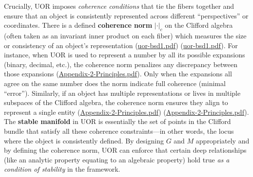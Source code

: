 \documentclass[12pt]{article}
\begin{document}
Crucially, UOR imposes \emph{coherence conditions} that tie the fibers together and ensure that an object is consistently represented across different “perspectives” or coordinates. There is a defined \textbf{coherence norm} $\lvert \cdot \rvert_c$ on the Clifford algebra (often taken as an invariant inner product on each fiber) which measures the size or consistency of an object’s representation (\href{file://file-QX2RAaHV3sY1bCttwB4hkL#:~:text=algebraic%20relations.%20The%20,UOR_%20Defined%201.pdf}{uor-bsd1.pdf}) (\href{file://file-QX2RAaHV3sY1bCttwB4hkL#:~:text=We%20require%20that%20all%20,of%20the%20%24r%24%20generators%20or}{uor-bsd1.pdf}). For instance, when UOR is used to represent a number by all its possible expansions (binary, decimal, etc.), the coherence norm penalizes any discrepancy between those expansions (\href{file://file-KHyFhnFGcNX7Hyf3H7G9jk#:~:text=its%20possible%20expansions,ensure%20the%20expansions%20cohere%20to}{Appendix-2-Principles.pdf}). Only when the expansions all agree on the same number does the norm indicate full coherence (minimal “error”). Similarly, if an object has multiple representations or lives in multiple subspaces of the Clifford algebra, the coherence norm ensures they align to represent a single entity (\href{file://file-KHyFhnFGcNX7Hyf3H7G9jk#:~:text=its%20possible%20expansions,ensure%20the%20expansions%20cohere%20to}{Appendix-2-Principles.pdf}) (\href{file://file-KHyFhnFGcNX7Hyf3H7G9jk#:~:text=number,the%20set%20of%20all%20consistent}{Appendix-2-Principles.pdf}). The \textbf{stable manifold} in UOR is essentially the set of points in the Clifford bundle that satisfy all these coherence constraints---in other words, the locus where the object is consistently defined. By designing $G$ and $M$ appropriately and by defining the coherence norm, UOR can enforce that certain deep relationships (like an analytic property equating to an algebraic property) hold true \emph{as a condition of stability} in the framework.

\medskip
\end{document}
